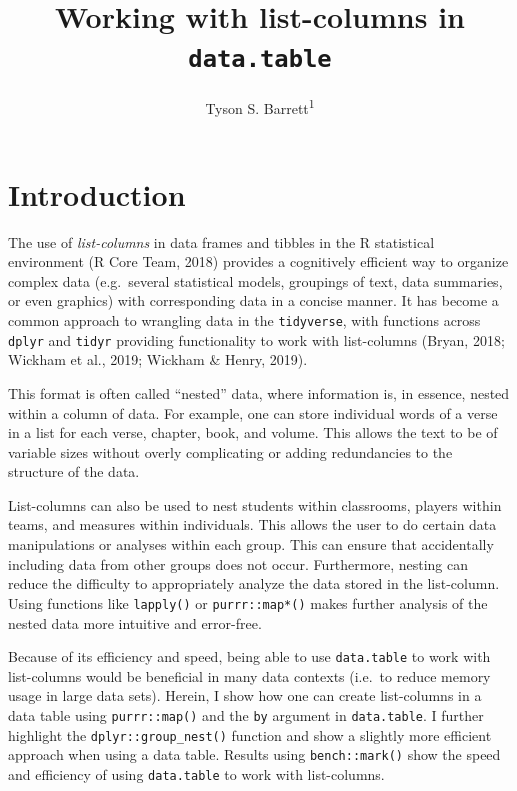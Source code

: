 \documentclass[doc,floatsintext]{apa6}
\title{Working with list-columns in \texttt{data.table}}
\author{Tyson S. Barrett\textsuperscript{1}}
\date{}
\affiliation{
\vspace{0.5cm}
\textsuperscript{1} Utah State University}
\begin{document}
\maketitle

\hypertarget{introduction}{%
\section{Introduction}\label{introduction}}

The use of \emph{list-columns} in data frames and tibbles in the R statistical environment (R Core Team, 2018) provides a cognitively efficient way to organize complex data (e.g.~several statistical models, groupings of text, data summaries, or even graphics) with corresponding data in a concise manner. It has become a common approach to wrangling data in the \texttt{tidyverse}, with functions across \texttt{dplyr} and \texttt{tidyr} providing functionality to work with list-columns (Bryan, 2018; Wickham et al., 2019; Wickham \& Henry, 2019).

This format is often called \enquote{nested} data, where information is, in essence, nested within a column of data. For example, one can store individual words of a verse in a list for each verse, chapter, book, and volume. This allows the text to be of variable sizes without overly complicating or adding redundancies to the structure of the data.

List-columns can also be used to nest students within classrooms, players within teams, and measures within individuals. This allows the user to do certain data manipulations or analyses within each group. This can ensure that accidentally including data from other groups does not occur. Furthermore, nesting can reduce the difficulty to appropriately analyze the data stored in the list-column. Using functions like \texttt{lapply()} or \texttt{purrr::map*()} makes further analysis of the nested data more intuitive and error-free.

Because of its efficiency and speed, being able to use \texttt{data.table} to work with list-columns would be beneficial in many data contexts (i.e.~to reduce memory usage in large data sets). Herein, I show how one can create list-columns in a data table using \texttt{purrr::map()} and the \texttt{by} argument in \texttt{data.table}. I further highlight the \texttt{dplyr::group\_nest()} function and show a slightly more efficient approach when using a data table. Results using \texttt{bench::mark()} show the speed and efficiency of using \texttt{data.table} to work with list-columns.
\end{document}
